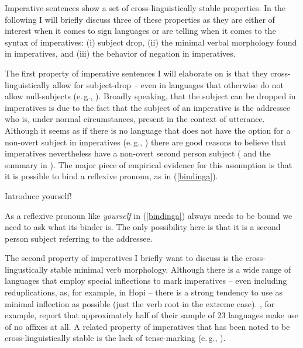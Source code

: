 Imperative sentences show a set of cross-linguistically stable properties. In the following I will briefly discuss three of these properties as they are either of interest when it comes to sign languages or are telling when it comes to the syntax of imperatives: (i) subject drop, (ii) the minimal verbal morphology found in imperatives, and (iii) the behavior of negation in imperatives. 

The first property of imperative sentences I will elaborate on is that they cross-linguistically allow for subject-drop -- even in languages that otherwise do not allow null-subjects (e.\,g., \citealt{alcazar2014syntax}). Broadly speaking, that the subject can be dropped in imperatives is due to the fact that the subject of an imperative is the addressee who is, under normal circumstances, present in the context of utterance. Although it seems as if there is no language that does not have the option for a non-overt subject in imperatives (e.\,g., \citealt{sadock1985speech}) there are good reasons to believe that imperatives nevertheless have a non-overt second person subject (\citealt{zwicky1988subject, potsdam1996syntactic} and the summary in \citealt[33--34]{van2007imperatives}). The major piece of empirical evidence for this assumption is that it is possible to bind a reflexive pronoun, as in (\ref{bindinga}).

\begin{exe}
\ex Introduce yourself! \label{bindinga}
\end{exe} 

\noindent As a reflexive pronoun like \textit{yourself} in (\ref{bindinga}) always needs to be bound we need to ask what its binder is. The only possibility here is that it is a second person subject referring to the addressee.

The second property of imperatives I briefly want to discuss is the cross-lingustically stable minimal verb morphology. Although there is a wide range of languages that employ special inflections to mark imperatives -- even including reduplications, as, for example, in Hopi \citet{benett1981} -- there is a strong tendency to use as minimal inflection as possible (just the verb root in the extreme case). \citet[172--173]{sadock1985speech}, for example, report that approximately half of their sample of 23 languages make use of no affixes at all. A related property of imperatives that has been noted to be cross-linguistically stable is the lack of tense-marking (e.\,g., \citealt{sadock1985speech}).


